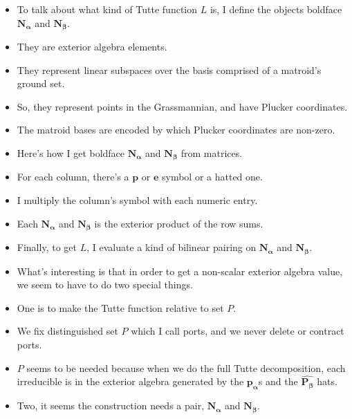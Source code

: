 \documentclass{article}
\begin{document}
\begin{itemize}
\item
To talk about what kind of Tutte function $L$ is, I define the
objects boldface $\mathbf{N_\alpha}$ and $\mathbf{N_\beta}$.

\item
They are exterior algebra elements.

\item
They represent linear subspaces over the basis comprised of a matroid's ground set.

\item
So, they represent points in the Grassmannian, and have Plucker coordinates.

\item
The matroid bases are encoded by which Plucker coordinates are non-zero.

\item
Here's how I get boldface $\mathbf{N_\alpha}$ and $\mathbf{N_\beta}$ from matrices.

\item
For each column, there's a $\mathbf{p}$ or $\mathbf{e}$ symbol or a hatted one.

\item
I multiply the column's symbol with each numeric entry.

\item
Each $\mathbf{N_\alpha}$ and $\mathbf{N_\beta}$ is the exterior product of the row sums.

\item
Finally, to get $L$, I evaluate a kind of bilinear pairing on $\mathbf{N_\alpha}$ and
$\mathbf{N_\beta}$.

\item
What's interesting is that in order to get a non-scalar exterior algebra value, we
seem to have to do two special things.

\item
One is to make the Tutte function relative to set $P$.

\item
We fix distinguished set $P$ which I call ports, and we never delete or contract ports.

\item
$P$ seems to be needed because when we do the full Tutte decomposition, each irreducible
is in the exterior algebra generated by the $\mathbf{p_\alpha}$s and the
$\widehat{\mathbf{P_\beta}}$ hats.

\item
Two, it seems the construction needs a pair, $\mathbf{N_\alpha}$ and $\mathbf{N_\beta}$.


\end{itemize}
\end{document}
